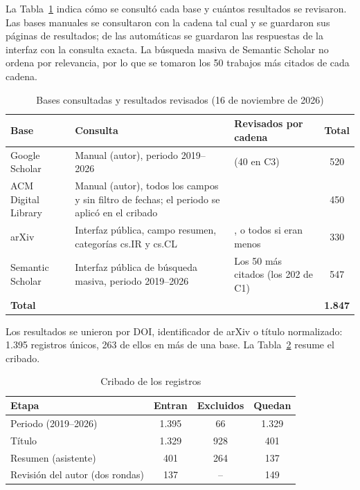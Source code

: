 La Tabla~\ref{tab:anx-bases} indica cómo se consultó cada base y cuántos resultados se revisaron. Las bases manuales se consultaron con la cadena tal cual y se guardaron sus páginas de resultados; de las automáticas se guardaron las respuestas de la interfaz con la consulta exacta. La búsqueda masiva de Semantic Scholar no ordena por relevancia, por lo que se tomaron los 50 trabajos más citados de cada cadena.

\begin{table}[htbp!]
    \centering
    \caption{Bases consultadas y resultados revisados (16 de noviembre de 2026)}
    \label{tab:anx-bases}
    \footnotesize
    \begin{tabular}{|>{\raggedright\arraybackslash}p{2.6cm}|>{\raggedright\arraybackslash}p{6.6cm}|>{\raggedright\arraybackslash}p{3.2cm}|c|}
        \hline
        \textbf{Base} & \textbf{Consulta} & \textbf{Revisados por cadena} & \textbf{Total} \\
        \hline
        Google Scholar & Manual (autor), periodo 2019--2026 & 60 (40 en C3) & 520 \\
        \hline
        ACM Digital Library & Manual (autor), todos los campos y sin filtro de fechas; el periodo se aplicó en el cribado & 50 & 450 \\
        \hline
        arXiv & Interfaz pública, campo resumen, categorías cs.IR y cs.CL & 50, o todos si eran menos & 330 \\
        \hline
        Semantic Scholar & Interfaz pública de búsqueda masiva, periodo 2019--2026 & Los 50 más citados (los 202 de C1) & 547 \\
        \hline
        \textbf{Total} & & & \textbf{1.847} \\
        \hline
    \end{tabular}
\end{table}

Los resultados se unieron por DOI, identificador de arXiv o título normalizado: 1.395 registros únicos, 263 de ellos en más de una base. La Tabla~\ref{tab:anx-cribado} resume el cribado.

\begin{table}[htbp!]
    \centering
    \caption{Cribado de los registros}
    \label{tab:anx-cribado}
    \small
    \begin{tabular}{|l|c|c|c|}
        \hline
        \textbf{Etapa} & \textbf{Entran} & \textbf{Excluidos} & \textbf{Quedan} \\
        \hline
        Periodo (2019--2026) & 1.395 & 66 & 1.329 \\
        \hline
        Título & 1.329 & 928 & 401 \\
        \hline
        Resumen (asistente) & 401 & 264 & 137 \\
        \hline
        Revisión del autor (dos rondas) & 137 & -- & 149 \\
        \hline
    \end{tabular}
\end{table}

